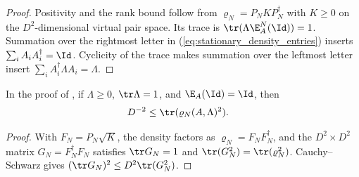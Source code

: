 \begin{proof}
    \leanok
    Positivity and the rank bound follow from $\varrho_N=P_NKP_N^\dagger$
    with $K\geq0$ on the $D^2$-dimensional virtual pair space. Its trace is
    $\tr(\Lambda\E_A^N(\Id))=1$. Summation over the rightmost letter in
    (\ref{eq:stationary_density_entries}) inserts $\sum_i A_iA_i^\dagger=\Id$.
    Cyclicity of the trace makes summation over the leftmost letter insert
    $\sum_iA_i^\dagger\Lambda A_i=\Lambda$.
\end{proof}

\begin{lemma}
    \label{thm:stationary_density_purity}
    \leanok
    In the proof of \cite[Theorem~2, lines~316--320]{PerezGarcia2008StringOrder},
    if $\Lambda\geq0$, $\tr\Lambda=1$, and $\E_A(\Id)=\Id$, then
    \begin{align}
        D^{-2} & \leq\tr(\varrho_N(A,\Lambda)^2).
        \label{eq:stationary_density_purity}
    \end{align}
\end{lemma}

\begin{proof}
    \leanok
    With $F_N=P_N\sqrt K$, the density factors as $\varrho_N=F_NF_N^\dagger$,
    and the $D^2\times D^2$ matrix $G_N=F_N^\dagger F_N$ satisfies
    $\tr G_N=1$ and $\tr(G_N^2)=\tr(\varrho_N^2)$.
    Cauchy--Schwarz gives $(\tr G_N)^2\leq D^2\tr(G_N^2)$.
\end{proof}

